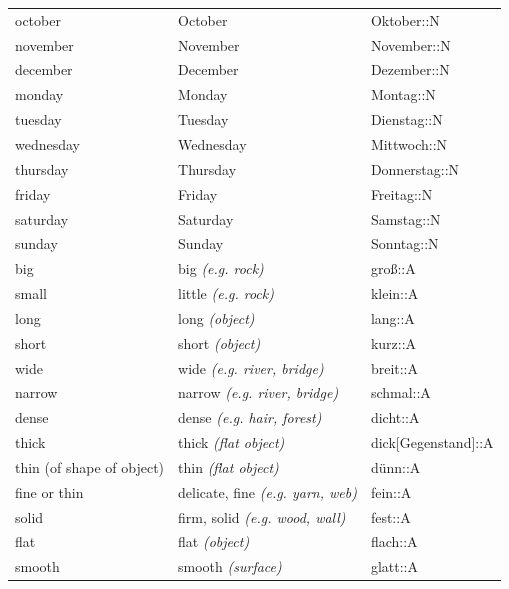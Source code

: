 \begin{center}
\begin{longtable}{lll}
{\sc \lowercase{	OCTOBER	}}	&	October		&	Oktober::N	\\
{\sc \lowercase{	NOVEMBER	}}	&	November		&	November::N	\\
{\sc \lowercase{	DECEMBER	}}	&	December		&	Dezember::N	\\
{\sc \lowercase{	MONDAY	}}	&	Monday		&	Montag::N	\\
{\sc \lowercase{	TUESDAY	}}	&	Tuesday		&	Dienstag::N	\\
{\sc \lowercase{	WEDNESDAY	}}	&	Wednesday		&	Mittwoch::N	\\
{\sc \lowercase{	THURSDAY	}}	&	Thursday		&	Donnerstag::N	\\
{\sc \lowercase{	FRIDAY	}}	&	Friday		&	Freitag::N	\\
{\sc \lowercase{	SATURDAY	}}	&	Saturday		&	Samstag::N	\\
{\sc \lowercase{	SUNDAY	}}	&	Sunday		&	Sonntag::N	\\
{\sc \lowercase{	BIG	}}	&	big	\textit{\footnotesize (e.g. rock)}	&	groß::A	\\
{\sc \lowercase{	SMALL	}}	&	little	\textit{\footnotesize (e.g. rock)}	&	klein::A	\\
{\sc \lowercase{	LONG	}}	&	long	\textit{\footnotesize (object)}	&	lang::A	\\
{\sc \lowercase{	SHORT	}}	&	short	\textit{\footnotesize (object)}	&	kurz::A	\\
{\sc \lowercase{	WIDE	}}	&	wide	\textit{\footnotesize (e.g. river, bridge)}	&	breit::A	\\
{\sc \lowercase{	NARROW	}}	&	narrow	\textit{\footnotesize (e.g. river, bridge)}	&	schmal::A	\\
{\sc \lowercase{	DENSE	}}	&	dense	\textit{\footnotesize (e.g. hair, forest)}	&	dicht::A	\\
{\sc \lowercase{	THICK	}}	&	thick	\textit{\footnotesize (flat object)}	&	dick[Gegenstand]::A	\\
{\sc \lowercase{	THIN \footnotesize (OF SHAPE OF OBJECT)	}}	&	thin	\textit{\footnotesize (flat object)}	&	dünn::A	\\
{\sc \lowercase{	FINE OR THIN	}}	&	delicate, fine	\textit{\footnotesize (e.g. yarn, web)}	&	fein::A	\\
{\sc \lowercase{	SOLID	}}	&	firm, solid	\textit{\footnotesize (e.g. wood, wall)}	&	fest::A	\\
{\sc \lowercase{	FLAT	}}	&	flat	\textit{\footnotesize (object)}	&	flach::A	\\
{\sc \lowercase{	SMOOTH	}}	&	smooth	\textit{\footnotesize (surface)}	&	glatt::A	\\

\end{longtable}
\end{center}

